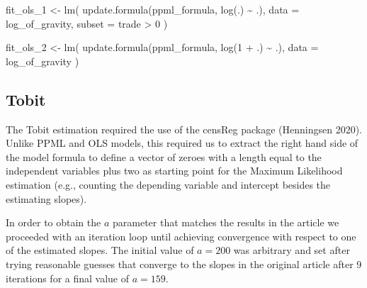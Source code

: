 \documentclass[12pt]{article}
\newenvironment{Shaded}{\begin{snugshade}}{\end{snugshade}}
\newcommand{\AttributeTok}[1]{\textcolor[rgb]{0.40,0.45,0.13}{#1}}
\newcommand{\DecValTok}[1]{\textcolor[rgb]{0.68,0.00,0.00}{#1}}
\newcommand{\FunctionTok}[1]{\textcolor[rgb]{0.28,0.35,0.67}{#1}}
\newcommand{\NormalTok}[1]{\textcolor[rgb]{0.00,0.23,0.31}{#1}}
\newcommand{\OtherTok}[1]{\textcolor[rgb]{0.00,0.23,0.31}{#1}}
\newcommand{\SpecialCharTok}[1]{\textcolor[rgb]{0.37,0.37,0.37}{#1}}
\begin{document}
\begin{Shaded}
\begin{Highlighting}[]
\NormalTok{fit\_ols\_1 }\OtherTok{\textless{}{-}} \FunctionTok{lm}\NormalTok{(}
  \FunctionTok{update.formula}\NormalTok{(ppml\_formula, }\FunctionTok{log}\NormalTok{(.) }\SpecialCharTok{\textasciitilde{}}\NormalTok{ .),}
  \AttributeTok{data =}\NormalTok{ log\_of\_gravity,}
  \AttributeTok{subset =}\NormalTok{ trade }\SpecialCharTok{\textgreater{}} \DecValTok{0}
\NormalTok{)}

\NormalTok{fit\_ols\_2 }\OtherTok{\textless{}{-}} \FunctionTok{lm}\NormalTok{(}
  \FunctionTok{update.formula}\NormalTok{(ppml\_formula, }\FunctionTok{log}\NormalTok{(}\DecValTok{1} \SpecialCharTok{+}\NormalTok{ .) }\SpecialCharTok{\textasciitilde{}}\NormalTok{ .),}
  \AttributeTok{data =}\NormalTok{ log\_of\_gravity}
\NormalTok{)}
\end{Highlighting}
\end{Shaded}

\subsection{Tobit}\label{tobit}

The Tobit estimation required the use of the censReg package (Henningsen
2020). Unlike PPML and OLS models, this required us to extract the right
hand side of the model formula to define a vector of zeroes with a
length equal to the independent variables plus two as starting point for
the Maximum Likelihood estimation (e.g., counting the depending variable
and intercept besides the estimating slopes).

In order to obtain the \(a\) parameter that matches the results in the
article we proceeded with an iteration loop until achieving convergence
with respect to one of the estimated slopes. The initial value of
\(a=200\) was arbitrary and set after trying reasonable guesses that
converge to the slopes in the original article after 9 iterations for a
final value of \(a=159\).
\end{document}
